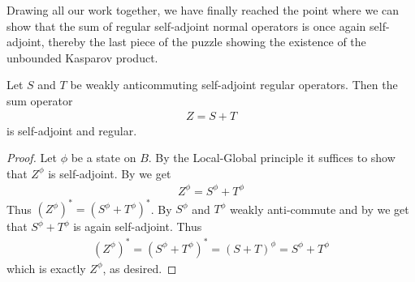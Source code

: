Drawing all our work together, we have finally reached the point where we can show that the sum of regular self-adjoint normal operators is once again self-adjoint, thereby the last piece of the puzzle showing the existence of the unbounded Kasparov product. 
\begin{theorem}\label{locglob71}
	Let $S$ and $T$ be weakly anticommuting self-adjoint regular operators. Then the sum operator 
	\begin{align*}
		Z=S+T
	\end{align*}
is self-adjoint and regular.
\end{theorem} 	
\begin{proof}
	Let $\phi$ be a state on $B$. By the Local-Global principle it suffices to show that $Z^\phi$ is self-adjoint. By  we get 
	\begin{align*}
		Z^\phi=S^\phi+T^\phi
	\end{align*}
	Thus $(Z^\phi)^*=(S^\phi+T^\phi)^*$. By  $S^\phi$ and $T^\phi$ weakly anti-commute and by  we get that $S^\phi+T^\phi$ is again self-adjoint. Thus 
	\begin{align*}
		(Z^\phi)^*=(S^\phi+T^\phi)^*=(S+T)^\phi=S^\phi+T^\phi
	\end{align*}
	which is exactly $Z^\phi$, as desired. 
\end{proof}
